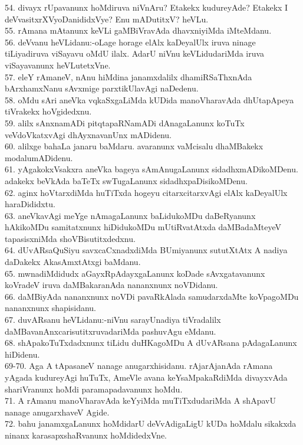 \documentclass{article}
\begin{document}
54. divayx rUpavanunx hoMdiruva niVnAru? Etakekx kudureyAde? Etakekx I deVvasitxrXVyoDanididxVye? Enu mADutitxV? heVLu.\\
55. rAmana mAtanunx keVLi gaMBiVravAda dhavxniyiMda iMteMdanu.\\
56. deVvanu heVLidanu:-oLage horage elAlx kaDeyalUlx iruva ninage tiLiyadiruva viSayavu oMdU ilalx. AdarU niVnu keVLidudariMda iruva viSayavanunx heVLutetxVne.\\
57. eleY rAmaneV, nAnu hiMdina janamxdalilx dhamiRSaThxnAda bArxhamxNanu sAvxmige parxtikUlavAgi naDedenu.\\
58. oMdu sAri aneVka vqkaSxgaLiMda kUDida manoVharavAda dhUtapApeya tiVrakekx hoVgidedxnu.\\
59. alilx sAnxnamADi pitqtapaRNamADi dAnagaLanunx koTuTx veVdoVkatxvAgi dhAyxnavanUnx mADidenu.\\
60. alilxge bahaLa janaru baMdaru. avaranunx vaMcisalu dhaMBakekx modalumADidenu.\\
61. yAgakokxVsakxra aneVka bageya sAmAnugaLanunx sidadhxmADikoMDenu. adakekx beVkAda baTeTx swTugaLanunx sidadhxpaDisikoMDenu.\\
62. aginx hoVtarxdiMda huTiTxda hogeyu citarxcitarxvAgi elAlx kaDeyalUlx haraDididxtu.\\
63. aneVkavAgi meYge nAmagaLanunx baLidukoMDu daBeRyanunx hAkikoMDu samitatxnunx hiDidukoMDu mUtiRvatAtxda daMBadaMteyeV tapasisxniMda shoVBisutitxdedxnu.\\
64. dUvARsaQuSiyu savxcaCxnadxdiMda BUmiyanunx sututXtAtx A nadiya daDakekx AkasAmxtAtxgi baMdanu.\\
65. mwnadiMdidudx aGayxRpAdayxgaLanunx koDade sAvxgatavanunx koVradeV iruva daMBakaranAda nananxnunx noVDidanu.\\
66. daMBiyAda nananxnunx noVDi pavaRkAlada samudarxdaMte koVpagoMDu nananxnunx shapisidanu.\\
67. duvARsanu heVLidanu:-niVnu sarayUnadiya tiVradalilx daMBavanAnxcarisutitxruvadariMda pashuvAgu eMdanu.\\
68. shApakoTuTxdadxnunx tiLidu duHKagoMDu A dUvARsana pAdagaLanunx hiDidenu.\\
69-70. Aga A tApasaneV nanage anugarxhisidanu. rAjarAjanAda rAmana yAgada kudureyAgi huTuTx, AmeVle avana keYsaMpakaRdiMda divayxvAda shariVranunx hoMdi paramapadavanunx hoMdu.\\
71. A rAmanu manoVharavAda keYyiMda muTiTxdudariMda A shApavU nanage anugarxhaveV Agide.\\
72. bahu janamxgaLanunx hoMdidarU deVvAdigaLigU kUDa hoMdalu sikakxda ninanx karasapxshaRvanunx hoMdidedxVne.\\
\end{document}
